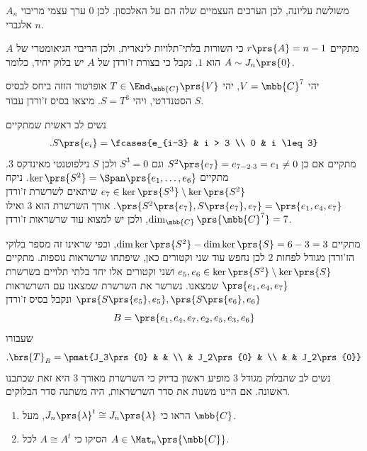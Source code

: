 \documentclass[a4paper,10pt,twoside,openany]{book}
\begin{document}
\begin{solution}
$A_n$
משולשת עליונה, לכן הערכים העצמיים שלה הם על האלכסון. לכן
$0$
ערך עצמי מריבוי אלגברי
$n$.

מתקיים
$r\prs{A} = n-1$
כי השורות בלתי־תלויות לינארית, ולכן הריבוי הגיאומטרי של
$A$
הוא
$1$.
נקבל כי בצורת ז'ורדן של
$A$
יש בלוק יחיד, כלומר
$A \sim J_n\prs{0}$.
\end{solution}

\begin{exercisechap}
יהי
$V = \mbb{C}^7$,
יהי
$T \in \End_{\mbb{C}}\prs{V}$
אופרטור הזזה ביחס לבסיס הסטנדרטי, ויהי
$S = T^3$.
מיצאו בסיס ז'ורדן עבור
$S$.
\end{exercisechap}

\begin{solution}
נשים לב ראשית שמתקיים
\begin{align*}
\text{.} S\prs{e_i} = \fcases{e_{i-3} & i > 3 \\
0 & i \leq 3}
\end{align*}
מתקיים אם כן
$S^2\prs{e_7} = e_{7-2 \cdot 3} = e_1 \neq 0$
וגם
$S^3 = 0$
ולכן
$S$
נילפוטנטי מאינדקס
$3$.
מתקיים
$\ker\prs{S^2} = \Span\prs{e_1, \ldots, e_6}$.
ניקח
$e_7 \in \ker\prs{S^3} \setminus \ker\prs{S^2}$
שיתאים לשרשרת ז'ורדן
$\prs{S^2\prs{e_7}, S\prs{e_7}, e_7} = \prs{e_1, e_4, e_7}$.
אורך השרשרת הוא
$3$
ואילו
$\dim_{\mbb{C}}\prs{\mbb{C}^7} = 7$,
ולכן יש למצוא עוד שרשראות ז'ורדן.

מתקיים
$\dim \ker\prs{S^2} - \dim \ker\prs{S} = 6-3 = 3$,
וכפי שראינו זה מספר בלוקי הז'ורדן מגודל לפחות
$2$
לכן נחפש עוד שני וקטורים כאן, שיפתחו שרשראות נוספות.
מתקיים
$e_5, e_6 \in \ker\prs{S^2} \setminus \ker\prs{S}$
ושני וקטורים אלו יחד בלתי תלויים בשרשרת
$\prs{e_1, e_4, e_7}$
שמצאנו. נשרשר את השרשרת שמצאנו עם השרשראות
$\prs{S\prs{e_5}, e_5}, \prs{S\prs{e_6},e_6}$
ונקבל בסיס ז'ורדן
\[B = \prs{e_1, e_4, e_7, e_2, e_5, e_3, e_6}\]
שעבורו
\[\text{.} \brs{T}_B = \pmat{J_3\prs{0} & & \\ & J_2\prs{0} & \\ & & J_2\prs{0}}\]
נשים לב שהבלוק מגודל
$3$
מופיע ראשון בדיוק כי השרשרת מאורך
$3$
היא זאת שכתבנו ראשונה. אם היינו משנות את סדר השרשראות, היה משתנה סדר הבלוקים.
\end{solution}

\begin{exercisechap}
\begin{enumerate}
\item הראו כי
$J_n\prs{\lambda}^t \cong J_n\prs{\lambda}$,
מעל
$\mbb{C}$.
\item הסיקו כי
$A \cong A^t$
לכל
$A \in \Mat_n\prs{\mbb{C}}$.
\end{enumerate}
\end{exercisechap}
\end{document}
